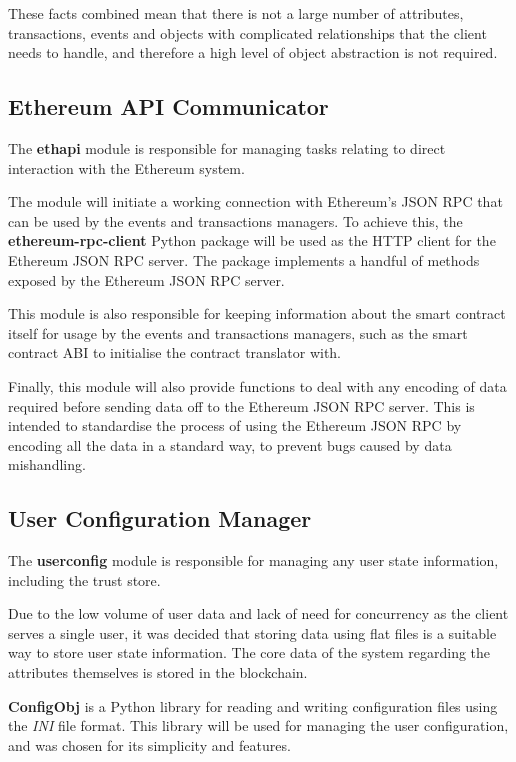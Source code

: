 \documentclass[12pt,a4paper]{report}
\begin{document}
	These facts combined mean that there is not a large number of attributes, transactions, events and objects with complicated relationships that the client needs to handle, and therefore a high level of object abstraction is not required.
	
	\subsection{Ethereum API Communicator}
	The \textbf{ethapi} module is responsible for managing tasks relating to direct interaction with the Ethereum system.
	
	The module will initiate a working connection with Ethereum's JSON RPC that can be used by the events and transactions managers. To achieve this, the \textbf{ethereum-rpc-client} Python package will be used as the HTTP client for the Ethereum JSON RPC server. The package implements a handful of methods exposed by the Ethereum JSON RPC server.\cite{18}
	
	This module is also responsible for keeping information about the smart contract itself for usage by the events and transactions managers, such as the smart contract ABI to initialise the contract translator with.
	
	Finally, this module will also provide functions to deal with any encoding of data required before sending data off to the Ethereum JSON RPC server. This is intended to standardise the process of using the Ethereum JSON RPC by encoding all the data in a standard way, to prevent bugs caused by data mishandling.
	
	\subsection{User Configuration Manager}
	The \textbf{userconfig} module is responsible for managing any user state information, including the trust store.
	
	Due to the low volume of user data and lack of need for concurrency as the client serves a single user, it was decided that storing data using flat files is a suitable way to store user state information. The core data of the system regarding the attributes themselves is stored in the blockchain.
	
	\textbf{ConfigObj} is a Python library for reading and writing configuration files using the \textit{INI} file format. This library will be used for managing the user configuration, and was chosen for its simplicity and features.
	
\end{document}
